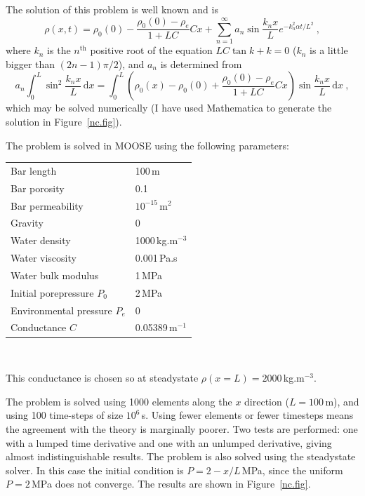 \documentclass[]{scrreprt}
\begin{document}
The solution of this problem is well known and is
\begin{equation}
\rho(x, t) = \rho_{0}(0) - \frac{\rho_{0}(0) - \rho_{e}}{1 + LC}Cx +
\sum_{n=1}^{\infty} a_{n}\sin \frac{k_{n}x}{L}e^{-k_{n}^{2}\alpha
  t/L^{2}} \ ,
\end{equation}
where $k_{n}$ is the $n^{\mathrm{th}}$ positive root of the equation
$LC\tan k + k=0$  ($k_{n}$ is a little bigger than
$(2n-1)\pi/2$), and $a_{n}$ is determined from
\begin{equation}
a_{n}\int_{0}^{L}\sin^{2}\frac{k_{n}x}{L}\,\mathrm{d}x =
\int_{0}^{L}\left(\rho_{0}(x) - \rho_{0}(0) + \frac{\rho_{0}(0) -
  \rho_{e}}{1 + LC}Cx\right)\sin \frac{k_{n}x}{L}\,\mathrm{d}x \ ,
\end{equation}
which may be solved numerically (I have used Mathematica to generate
the solution in Figure~\ref{nc.fig}).

\noindent The problem is solved in MOOSE using the following parameters:
\begin{center}
\begin{tabular}{|ll|}
\hline
Bar length & 100\,m \\
Bar porosity & 0.1 \\
Bar permeability & $10^{-15}$\,m$^{2}$ \\
\hline
Gravity & 0 \\
\hline
Water density & 1000\,kg.m$^{-3}$ \\
Water viscosity & 0.001\,Pa.s \\
Water bulk modulus & 1\,MPa \\
\hline
Initial porepressure $P_{0}$ & 2\,MPa \\
Environmental pressure $P_{e}$ & 0 \\
\hline
Conductance $C$ & 0.05389\,m$^{-1}$ \\
\hline
\end{tabular} \\
\end{center}
This conductance is chosen so at steadystate $\rho(x=L)=2000$\,kg.m$^{-3}$.

The problem is solved using 1000 elements along the $x$ direction
($L=100$\,m), and using 100 time-steps of size $10^6$\,s.  Using fewer
elements or fewer timesteps means the agreement with the theory is
marginally poorer.  Two tests are performed: one with a lumped time
derivative and one with an unlumped derivative, giving almost
indistinguishable results.  The problem is also
solved using the steadystate solver.  In this case the initial
condition is $P=2-x/L$\,MPa, since the uniform $P=2$\,MPa does not
converge.  The results are shown in Figure~\ref{nc.fig}.
\end{document}
